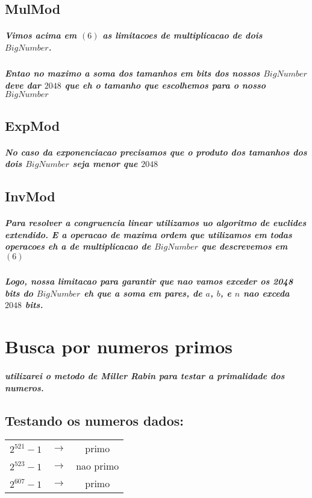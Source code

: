 \documentclass[12pt,twoside, a4paper, twocolumn]{article}
\begin{document}
\subsection{MulMod}

\subparagraph*{Vimos acima em $(6)$ as limitacoes de multiplicacao de dois $BigNumber$.}

\subparagraph*{Entao no maximo a soma dos tamanhos em bits dos nossos $BigNumber$ deve dar $2048$ que eh o tamanho que escolhemos para o nosso $BigNumber$}

\subsection{ExpMod}

\subparagraph*{No caso da exponenciacao precisamos que o produto dos tamanhos dos dois $BigNumber$ seja menor que $2048$ }

\subsection{InvMod}

\subparagraph*{Para resolver a congruencia linear utilizamos uo algoritmo de euclides extendido. E a operacao de maxima ordem que utilizamos em todas operacoes eh a de multiplicacao de $BigNumber$ que descrevemos em $(6)$}

\subparagraph*{Logo, nossa limitacao para garantir que nao vamos exceder os 2048 bits do $BigNumber$ eh que a soma em pares, de $a$, $b$, e $n$ nao exceda $2048$ bits.}

\section{Busca por numeros primos}

\subparagraph*{utilizarei o metodo de Miller Rabin para testar a primalidade dos numeros.}

\subsection{Testando os numeros dados:}

\begin{center}
    \begin{tabular}{ |ccc| }
        \hline
        $2^{521}-1$ & $\rightarrow$ & primo     \\
        $2^{523}-1$ & $\rightarrow$ & nao primo \\
        $2^{607}-1$ & $\rightarrow$ & primo     \\
        \hline
    \end{tabular}
\end{center}
\end{document}
